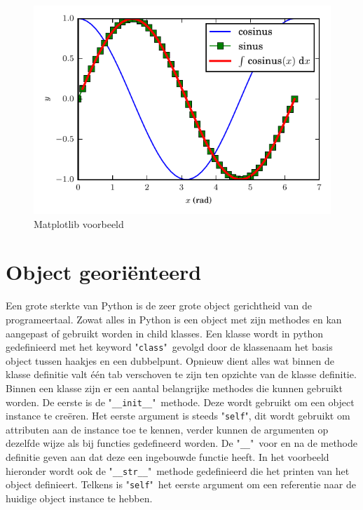 \documentclass[11pt,twoside]{article}
\begin{document}
\begin{figure}[ht]
	\centering
	\includegraphics{examples/sinus_cosinus}
	\caption{Matplotlib voorbeeld}
	\label{fig:sinus_cosinus}
\end{figure}

	\section{Object georiënteerd} 
Een grote sterkte van Python is de zeer grote object gerichtheid van de programeertaal. Zowat alles in Python is een object met zijn methodes en kan aangepast of gebruikt worden in child klasses. Een klasse wordt in python gedefinieerd met het keyword "\lstinline{class}"\ gevolgd door de klassenaam het basis object tussen haakjes en een dubbelpunt. Opnieuw dient alles wat binnen de klasse definitie valt één tab verschoven te zijn ten opzichte van de klasse definitie. Binnen een klasse zijn er een aantal belangrijke methodes die kunnen gebruikt worden. De eerste is de "\lstinline{__init__}"\ methode. Deze wordt gebruikt om een object instance te creëren. Het eerste argument is steeds "\lstinline{self}", dit wordt gebruikt om attributen aan de instance toe te kennen, verder kunnen de argumenten op dezelfde wijze als bij functies gedefineerd worden. De "\lstinline{__}"\ voor en na de methode definitie geven aan dat deze een ingebouwde functie heeft. In het voorbeeld hieronder wordt ook de "\lstinline{__str__}"\ methode gedefinieerd die het printen van het object definieert. Telkens is "\lstinline{self}"\ het eerste argument om een referentie naar de huidige object instance te hebben.
\end{document}
